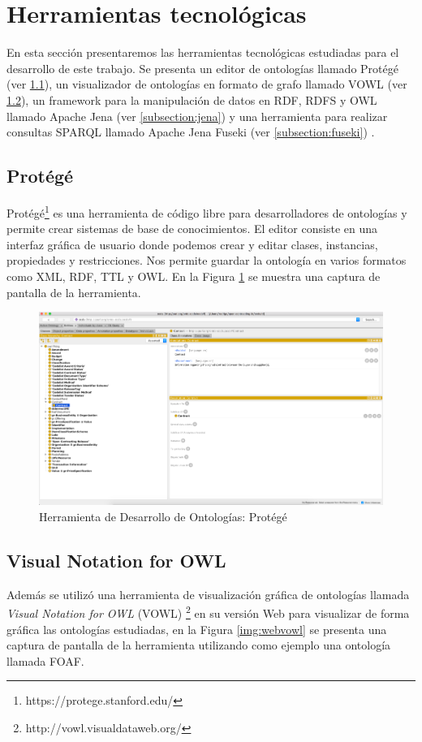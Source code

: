 \section{Herramientas tecnológicas}
En esta sección presentaremos las herramientas tecnológicas estudiadas para el desarrollo de este trabajo. Se presenta un editor de ontologías llamado Protégé (ver \ref{subsection:protege}), un visualizador de ontologías en formato de grafo llamado VOWL (ver \ref{subsection:vowl}), un framework para la manipulación de datos en RDF, RDFS y OWL llamado Apache Jena (ver \ref{subsection:jena}) y una herramienta para realizar consultas SPARQL llamado Apache Jena Fuseki (ver \ref{subsection:fuseki}) .
\subsection{Protégé}
\label{subsection:protege}
Protégé\footnote{https://protege.stanford.edu/} es una herramienta de código libre para desarrolladores de ontologías y permite crear sistemas de base de conocimientos. El editor consiste en una interfaz gráfica de usuario donde podemos crear y editar clases, instancias, propiedades y restricciones. Nos permite guardar la ontología en varios formatos como XML, RDF, TTL y OWL. En la Figura \ref{img:protege} se muestra una captura de pantalla de la herramienta.

\begin{figure}[h!]
    \centering
    \includegraphics[width=150mm]{figuras/protege}
    \caption{Herramienta de Desarrollo de Ontologías: Protégé}
    \label{img:protege}
    \end{figure}

\subsection{Visual Notation for OWL}
\label{subsection:vowl}
Además se utilizó una herramienta de visualización gráfica de ontologías llamada \textit{Visual Notation for OWL} (VOWL) \footnote{http://vowl.visualdataweb.org/} en su versión Web para visualizar de forma gráfica las ontologías estudiadas, en la Figura \ref{img:webvowl} se presenta una captura de pantalla de la herramienta utilizando como ejemplo una ontología llamada FOAF.

